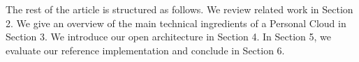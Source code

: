 The rest of the article is structured as follows. We review related work in Section 2. We give an
overview of the main technical ingredients of a Personal Cloud in Section 3. We introduce our 
open architecture in Section 4. In Section 5, we evaluate our reference implementation and conclude
in Section 6.